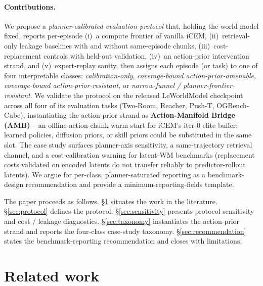\documentclass{article}
\begin{document}
\paragraph{Contributions.}
We propose a \emph{planner-calibrated evaluation protocol} that, holding the world model fixed, reports per-episode (i)~a compute frontier of vanilla iCEM, (ii)~retrieval-only leakage baselines with and without same-episode chunks, (iii)~cost-replacement controls with held-out validation, (iv)~an action-prior intervention strand, and (v)~expert-replay sanity, then assigns each episode (or task) to one of four interpretable classes: \emph{calibration-only}, \emph{coverage-bound action-prior-amenable}, \emph{coverage-bound action-prior-resistant}, or \emph{narrow-funnel / planner-frontier-resistant}. We validate the protocol on the released LeWorldModel checkpoint across all four of its evaluation tasks (Two-Room, Reacher, Push-T, OGBench-Cube), instantiating the action-prior strand as \textbf{Action-Manifold Bridge (AMB)} -- an offline-action-chunk warm start for iCEM's iter-0 elite buffer; learned policies, diffusion priors, or skill priors could be substituted in the same slot. The case study surfaces planner-axis sensitivity, a same-trajectory retrieval channel, and a cost-calibration warning for latent-WM benchmarks (replacement costs validated on encoded latents do not transfer reliably to predictor-rollout latents). We argue for per-class, planner-saturated reporting as a benchmark-design recommendation and provide a minimum-reporting-fields template.

The paper proceeds as follows. \S\ref{sec:related-work} situates the work in the literature. \S\ref{sec:protocol} defines the protocol. \S\ref{sec:sensitivity} presents protocol-sensitivity and cost / leakage diagnostics. \S\ref{sec:taxonomy} instantiates the action-prior strand and reports the four-class case-study taxonomy. \S\ref{sec:recommendation} states the benchmark-reporting recommendation and closes with limitations.

\section{Related work}
\label{sec:related-work}
\end{document}
